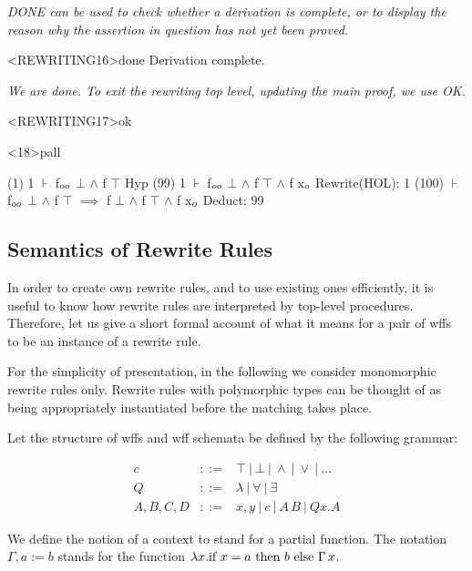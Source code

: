 \begin{tpsexample}
{\it DONE can be used to check whether a derivation is complete, or to display the reason why the assertion in question has not yet been proved.}

<REWRITING16>done
Derivation complete.

{\it We are done. To exit the rewriting top level, updating the main proof, we use OK.}

<REWRITING17>ok


<18>pall

(1)   1 \(\assert\)  f\(\sb{oo}\) \(\bot\) \(\land\) f \(\top\)                                                      Hyp
(99)  1 \(\assert\)  f\(\sb{oo}\) \(\bot\) \(\land\) f \(\top\) \(\land\) f x\(\sb{o}\)                                   Rewrite(HOL): 1
(100) \(\assert\)  f\(\sb{oo}\) \(\bot\) \(\land\) f \(\top\) \(\implies\) f \(\bot\) \(\land\) f \(\top\) \(\land\) f x\(\sb{o}\)                              Deduct: 99
\end{tpsexample}

\subsection{Semantics of Rewrite Rules}

In order to create own rewrite rules, and to use existing ones efficiently, it
is useful to know how rewrite rules are interpreted by top-level procedures.
Therefore, let us give a short formal account of what it means for a pair of
wffs to be an instance of a rewrite rule.

For the simplicity of presentation, in the following we
consider monomorphic rewrite rules only. Rewrite rules with polymorphic types
can be thought of as being appropriately instantiated before the matching takes
place.

Let the structure of wffs and wff schemata be defined by the following grammar:

\[\begin{array}{rcl}
c & ::= & \top\ |\ \bot\ |\ \land\ |\ \lor\ |\ \ldots\\
Q & ::= & \lambda\ |\ \forall\ |\ \exists \\
A,B,C,D & ::= & x,y\ |\ c\ |\ A\,B\ |\ Qx.A
\end{array}\]

We define the notion of a context to stand for a partial function. The notation
$\Gamma,a{:=}b$ stands for the function
$\lambda x.\textup{if }x=a\textup{ then }b\textup{ else }\Gamma\,x$.

